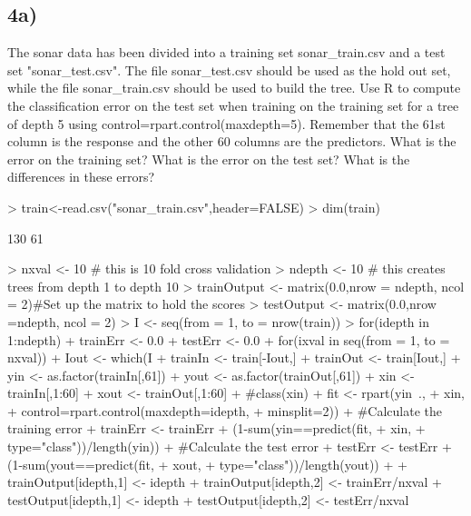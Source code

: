 \documentclass{article}
\begin{document}
\subsection*{4a)}
 The sonar data has been divided into a training set sonar\_train.csv
 and a test set "sonar\_test.csv". 
 The file sonar\_test.csv should be used as the hold out set,
 while the file sonar\_train.csv should be used to build the tree. 
 Use R to compute the classification error on the test set 
 when training on the training set for a tree of depth 5 
 using control=rpart.control(maxdepth=5).
 Remember that the 61st column is 
 the response and the other 60 columns are the predictors. 
 What is the error on the training set? What is the error on the test set?
 What is the differences in these errors?

\begin{Schunk}
\begin{Sinput}
> train<-read.csv("sonar_train.csv",header=FALSE)
> dim(train)
\end{Sinput}
\begin{Soutput}
[1] 130  61
\end{Soutput}
\begin{Sinput}
> nxval <- 10  # this is 10 fold cross validation
> ndepth <- 10 # this creates trees from depth 1 to depth 10
> trainOutput <- matrix(0.0,nrow = ndepth, ncol = 2)#Set up the matrix to hold the scores
> testOutput <- matrix(0.0,nrow =ndepth, ncol = 2)
> I <- seq(from = 1, to = nrow(train))
> for(idepth in 1:ndepth){
+ 	trainErr <- 0.0 
+ 	testErr <- 0.0   
+ 	for(ixval in seq(from =  1, to = nxval)){
+ 		Iout <- which(I%%nxval == ixval%%nxval)
+ 		trainIn <- train[-Iout,]
+ 		trainOut <- train[Iout,]
+ 		yin <- as.factor(trainIn[,61])
+ 		yout <- as.factor(trainOut[,61])
+ 		xin <- trainIn[,1:60]
+ 		xout <- trainOut[,1:60]
+ 		#class(xin)
+ 		fit <- rpart(yin~.,
+ 		             xin,
+ 		             control=rpart.control(maxdepth=idepth, 
+ 		                                   minsplit=2))
+ 		#Calculate the training error
+ 		trainErr <- trainErr + (1-sum(yin==predict(fit,
+ 		                                           xin,
+ 		                                           type="class"))/length(yin))
+ 		#Calculate the test error
+ 		testErr <- testErr + (1-sum(yout==predict(fit,
+ 		                                          xout,
+ 		                                          type="class"))/length(yout))
+ 	}
+ 	trainOutput[idepth,1] <- idepth
+ 	trainOutput[idepth,2] <- trainErr/nxval
+ 	testOutput[idepth,1] <- idepth
+ 	testOutput[idepth,2] <- testErr/nxval
}
\end{Sinput}
\end{Schunk}
\end{document}
